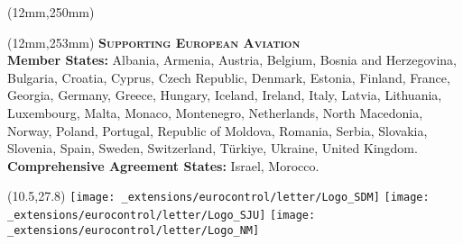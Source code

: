 {  \begin{textblock*}{186mm}(12mm,250mm)
    \ecrule[prussianblue]{\hsize}{1pt}
  \end{textblock*}

  \begin{textblock*}{186mm}(12mm,253mm)
  {%
    \fontsize{10}{5}\selectfont\sffamily
    \textsc{\textbf{\textcolor{prussianblue}{Supporting European Aviation}}}\\
    \fontsize{9}{5}\selectfont\sffamily\color[gray]{0.3}
    \textbf{Member States:} Albania, Armenia, Austria, Belgium, Bosnia and Herzegovina, Bulgaria,
    Croatia, Cyprus, Czech Republic, Denmark, Estonia, Finland, France, Georgia, Germany, Greece,
    Hungary, Iceland, Ireland, Italy, Latvia, Lithuania, Luxembourg, Malta, Monaco, Montenegro, Netherlands,
    North Macedonia, Norway, Poland, Portugal, Republic of Moldova, Romania, Serbia, Slovakia,
    Slovenia, Spain, Sweden, Switzerland, Türkiye, Ukraine, United Kingdom.
    \\
    \textbf{Comprehensive Agreement States:} Israel, Morocco.
  }
  \end{textblock*}


  \begin{textblock}{9.5}(10.5,27.8)\hfill
    \texttt{[image: \_extensions/eurocontrol/letter/Logo\_SDM]}\hspace{5mm}
    \texttt{[image: \_extensions/eurocontrol/letter/Logo\_SJU]}\hspace{3.5mm}
    \texttt{[image: \_extensions/eurocontrol/letter/Logo\_NM]}
  \end{textblock}



}


\makeatletter
{}
\makeatother


\usepackage{fancyhdr}
\usepackage{lastpage}

\pagestyle{fancy}


\flagsdefault[width=4mm]

